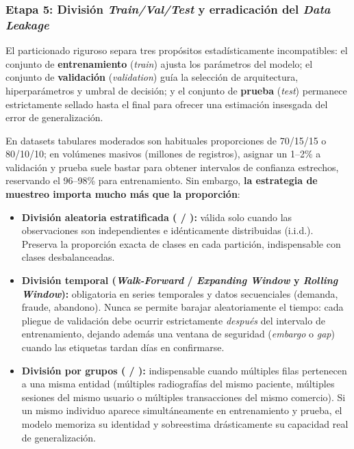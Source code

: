 \subsubsection{Etapa 5: División \textit{Train/Val/Test} y erradicación del \textit{Data Leakage}}

El particionado riguroso separa tres propósitos estadísticamente incompatibles: el conjunto de \textbf{entrenamiento} (\textit{train}) ajusta los parámetros del modelo; el conjunto de \textbf{validación} (\textit{validation}) guía la selección de arquitectura, hiperparámetros y umbral de decisión; y el conjunto de \textbf{prueba} (\textit{test}) permanece estrictamente sellado hasta el final para ofrecer una estimación insesgada del error de generalización.

En datasets tabulares moderados son habituales proporciones de 70/15/15 o 80/10/10; en volúmenes masivos (millones de registros), asignar un 1--2\% a validación y prueba suele bastar para obtener intervalos de confianza estrechos, reservando el 96--98\% para entrenamiento. Sin embargo, \textbf{la estrategia de muestreo importa mucho más que la proporción}:

\begin{itemize}
  \item \textbf{División aleatoria estratificada ( / ):} válida solo cuando las observaciones son independientes e idénticamente distribuidas (i.i.d.). Preserva la proporción exacta de clases en cada partición, indispensable con clases desbalanceadas.
  \item \textbf{División temporal (\textit{Walk-Forward} / \textit{Expanding Window} y \textit{Rolling Window}):} obligatoria en series temporales y datos secuenciales (demanda, fraude, abandono). Nunca se permite barajar aleatoriamente el tiempo: cada pliegue de validación debe ocurrir estrictamente \textit{después} del intervalo de entrenamiento, dejando además una ventana de seguridad (\textit{embargo} o \textit{gap}) cuando las etiquetas tardan días en confirmarse.
  \item \textbf{División por grupos ( / ):} indispensable cuando múltiples filas pertenecen a una misma entidad (múltiples radiografías del mismo paciente, múltiples sesiones del mismo usuario o múltiples transacciones del mismo comercio). Si un mismo individuo aparece simultáneamente en entrenamiento y prueba, el modelo memoriza su identidad y sobreestima drásticamente su capacidad real de generalización.
\end{itemize}

